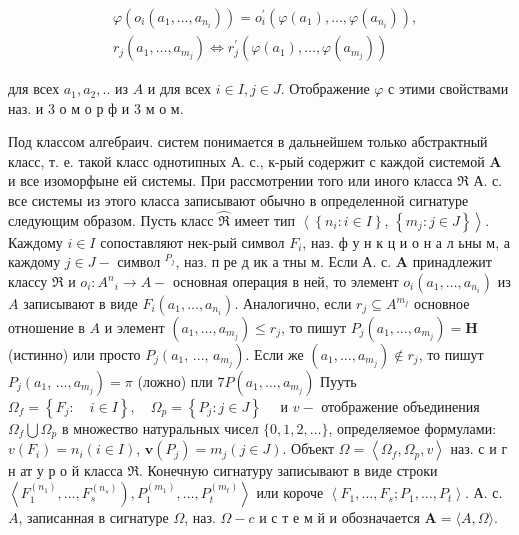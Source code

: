 \documentclass[10pt]{article}
\begin{document}
\[

\begin{aligned}

& \varphi\left(o_{i}\left(a_{1}, \ldots, a_{n_{i}}\right)\right)=o_{i}^{\prime}\left(\varphi\left(a_{1}\right), \ldots, \varphi\left(a_{n_{i}}\right)\right), \\

& r_{j}\left(a_{1}, \ldots, a_{m_{j}}\right) \Longleftrightarrow r_{j}^{\prime}\left(\varphi\left(a_{1}\right), \ldots, \varphi\left(a_{m_{j}}\right)\right)

\end{aligned}

\]



для всех $a_{1}, a_{2}, .$. из $A$ и для всех $i \in I, j \in J$. Отображение $\varphi$ с этими свойствами наз. и 3 о м о р ф и 3 м о м.



Под классом алгебраич. систем понимается в дальнейшем только абстрактный класс, т. е. такой класс однотипных А. с., к-рый содержит с каждой системой $\boldsymbol{A}$ и все изоморфыне ей системы. При рассмотрении того или иного класса $\Re$ А. с. все системы из этого класса записывают обычно в определенной сигнатуре следующим образом. Пусть класс $\overparen{\Re}$ имеет тип $\left\langle\left\{n_{i}: i \in I\right\}\right.$, $\left.\left\{m_{j}: j \in J\right\}\right\rangle$. Каждому $i \in I$ сопоставляют нек-рый символ $F_{i}$, наз. ф у н к ц и о н а л ьны м, а каждому $j \in J-$ символ $^{P_{j}}$, наз. п ре д ик а тны м. Если А. с. $\boldsymbol{A}$ принадлежит классу $\mathfrak{\Re}$ и $o_{i}: A^{n}{ }_{i} \rightarrow A-$ основная операция в ней, то элемент $o_{i}\left(a_{1}, \ldots, a_{n_{i}}\right)$ из $A$ записывают в виде $F_{i}\left(a_{1}, \ldots, a_{n_{i}}\right)$. Аналогично, если $r_{j} \subseteq A^{m_{j}}$ основное отношение в $A$ и элемент $\left(a_{1}, \ldots, a_{m_{j}}\right) \leqslant r_{j}$, то пишут $P_{j}\left(a_{1}, \ldots, a_{m_{j}}\right)=\boldsymbol{H}$ (истинно) или просто $P_{j}\left(a_{1}\right.$, ..., $\left.a_{m_{j}}\right)$. Если же $\left(a_{1}, \ldots, a_{m_{j}}\right) \notin r_{j}$, то пишут $P_{j}\left(a_{1}\right.$, $\left.\ldots, a_{m_{j}}\right)=\pi$ (ложно) пли $7 P\left(a_{1}, \ldots, a_{m_{j}}\right)$ Пууть $\Omega_{f}=\left\{F_{j}: \quad i \in I\right\}, \quad \Omega_{p}=\left\{P_{j}: j \in J\right\} \quad$ и $v-$ отображение объединения $\Omega_{f} \bigcup \Omega_{p}$ в множество натуральных чисел $\{0,1,2, \ldots\}$, определяемое формулами: $v\left(F_{i}\right)=n_{i}(i \in I)$, $\boldsymbol{v}\left(P_{j}\right)=m_{j}(j \in J)$. Объект $\Omega=\left\langle\Omega_{f}, \Omega_{p}, v\right\rangle$ наз. с и г н ат у р о й класса $\Re$. Конечную сигнатуру записывают в виде строки $\left.\left\langle F_{1}^{\left(n_{1}\right)}, \ldots, F_{s}^{\left(n_{s}\right)}\right), P_{1}^{\left(m_{1}\right)}, \ldots, P_{t}^{\left(m_{t}\right)}\right\rangle$ или короче $\left\langle F_{1}, \ldots, F_{s} ; P_{1}, \ldots, P_{t}\right\rangle$. А. с. $A$, записанная в сигнатуре $\Omega$, наз. $\Omega-c$ и с т е м й и обозначается $\boldsymbol{A}=\langle A, \Omega\rangle$.
\end{document}
